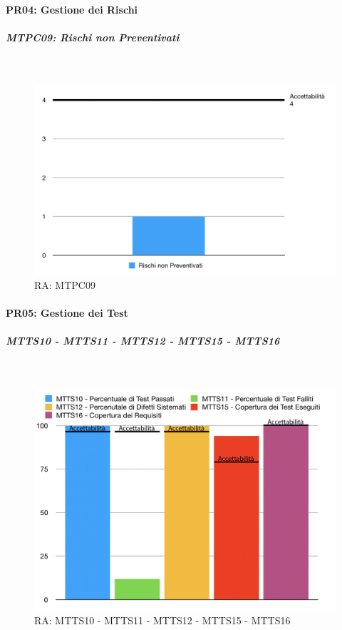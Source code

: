 \paragraph{PR04: Gestione dei Rischi}
\subparagraph{MTPC09: Rischi non Preventivati} \-\\

\begin{figure}[H]
	\begin{center}
		\includegraphics[scale=0.5]{./images/grafici_RA/MTPC09.png} 
		\caption{RA: MTPC09}
	\end{center}
\end{figure}

\paragraph{PR05: Gestione dei Test}
\subparagraph{MTTS10 - MTTS11 - MTTS12 - MTTS15 - MTTS16} \-\\

\begin{figure}[H]
	\begin{center}
		\includegraphics[scale=0.5]{./images/grafici_RA/PR05_percentuali.png} 
		\caption{RA: MTTS10 - MTTS11 - MTTS12 - MTTS15 - MTTS16}
	\end{center}
\end{figure}

